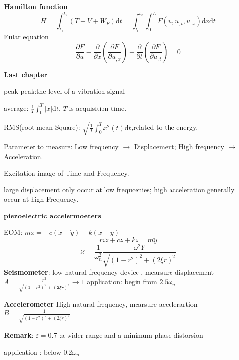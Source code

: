 \documentclass{article}
\begin{document}
\begin{multicols*}{3}
 


 \textbf{Hamilton function}
\begin{equation*}
  H=\int_{t_{1}}^{t_{2}}(T-V+W_{F})\text{d}t
  =\int_{t_{1}}^{t_{2}}\int_{0}^{L}F(u,u_{,t},u_{,x})\text{d}x\text{d}t
\end{equation*}
Eular equation
\begin{equation*}
  \frac{\partial F}{\partial u}-\frac{\partial}{\partial x}(\frac{\partial F}{\partial u_{,x}})-\frac{\partial}{\partial t}(\frac{\partial F}{\partial u_{,t}})=0
\end{equation*}

\noindent\textbf{Last chapter}

peak-peak:the level of a vibration signal

average: $\frac{1}{T}\int_{0}^{T}|x|\text{d}t$, $T$ is acquisition time.

RMS(root mean Square): $\sqrt{\frac{1}{T}\int_{0}^{T}x^{2}(t)\text{d}t}$,related  to the energy.

Parameter to measure: Low frequency $\rightarrow$ Displacement; High frequency $\rightarrow$ Acceleration.

Excitation image of Time and Frequency.



large displacement only occur at low frequcenies; high acceleration generally occur at high Frequency.

\noindent\textbf{piezoelectric accelermoeters}

EOM: $m \ddot{x} = -c(\dot{x}-\dot{y}) - k(x-y)$
\begin{equation*}
  m\ddot{z}+c\dot{z}+kz=m\ddot{y}
\end{equation*}
\begin{equation*}
  Z=\frac{1}{\omega_{n}^{2}}\frac{\omega^{2}Y}{\sqrt{(1-r^{2})^{2}+(2\xi r)^{2}}}
\end{equation*}
\textbf{Seismometer}: low natural frequency device , mearsure displacement 
$A=\frac{r^{2}}{\sqrt{(1-r^{2})^{2}+(2\xi r)^{2}}}\rightarrow 1$
application: begin from $2.5 \omega_{n}$

\textbf{Accelerometer}
High natural frequency, mearsure accelerartion 
$B=\frac{1}{\sqrt{(1-r^{2})^{2}+(2\xi r)^{2}}}$

\textbf{Remark}: 
$\varepsilon=0.7$ :a wider range and a minimum phase distorsion

application : below $0.2\omega_{n}$


\end{multicols*}
\end{document}
